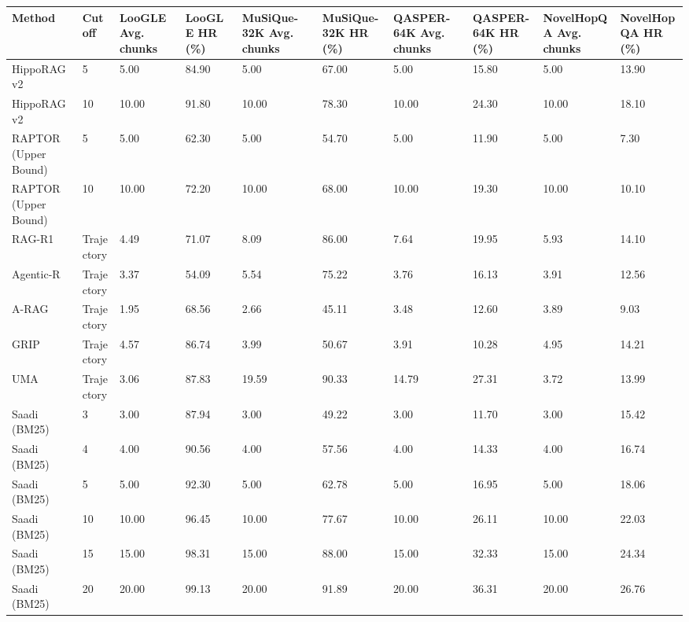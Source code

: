 \begin{tabular}{llllllllll}
\hline
Method & Cutoff & LooGLE Avg. chunks & LooGLE HR (\%) & MuSiQue-32K Avg. chunks & MuSiQue-32K HR (\%) & QASPER-64K Avg. chunks & QASPER-64K HR (\%) & NovelHopQA Avg. chunks & NovelHopQA HR (\%) \\
\hline
HippoRAG v2 & 5 & 5.00 & 84.90 & 5.00 & 67.00 & 5.00 & 15.80 & 5.00 & 13.90 \\
HippoRAG v2 & 10 & 10.00 & 91.80 & 10.00 & 78.30 & 10.00 & 24.30 & 10.00 & 18.10 \\
RAPTOR (Upper Bound) & 5 & 5.00 & 62.30 & 5.00 & 54.70 & 5.00 & 11.90 & 5.00 & 7.30 \\
RAPTOR (Upper Bound) & 10 & 10.00 & 72.20 & 10.00 & 68.00 & 10.00 & 19.30 & 10.00 & 10.10 \\
RAG-R1 & Trajectory & 4.49 & 71.07 & 8.09 & 86.00 & 7.64 & 19.95 & 5.93 & 14.10 \\
Agentic-R & Trajectory & 3.37 & 54.09 & 5.54 & 75.22 & 3.76 & 16.13 & 3.91 & 12.56 \\
A-RAG & Trajectory & 1.95 & 68.56 & 2.66 & 45.11 & 3.48 & 12.60 & 3.89 & 9.03 \\
GRIP & Trajectory & 4.57 & 86.74 & 3.99 & 50.67 & 3.91 & 10.28 & 4.95 & 14.21 \\
UMA & Trajectory & 3.06 & 87.83 & 19.59 & 90.33 & 14.79 & 27.31 & 3.72 & 13.99 \\
Saadi (BM25) & 3 & 3.00 & 87.94 & 3.00 & 49.22 & 3.00 & 11.70 & 3.00 & 15.42 \\
Saadi (BM25) & 4 & 4.00 & 90.56 & 4.00 & 57.56 & 4.00 & 14.33 & 4.00 & 16.74 \\
Saadi (BM25) & 5 & 5.00 & 92.30 & 5.00 & 62.78 & 5.00 & 16.95 & 5.00 & 18.06 \\
Saadi (BM25) & 10 & 10.00 & 96.45 & 10.00 & 77.67 & 10.00 & 26.11 & 10.00 & 22.03 \\
Saadi (BM25) & 15 & 15.00 & 98.31 & 15.00 & 88.00 & 15.00 & 32.33 & 15.00 & 24.34 \\
Saadi (BM25) & 20 & 20.00 & 99.13 & 20.00 & 91.89 & 20.00 & 36.31 & 20.00 & 26.76 \\
\hline
\end{tabular}
